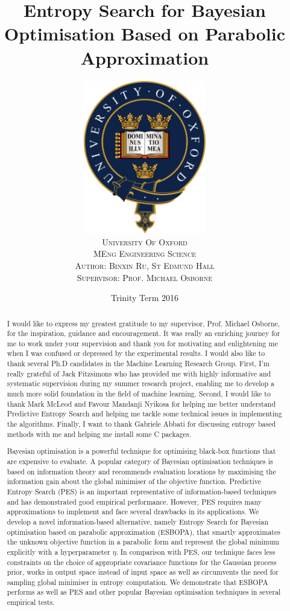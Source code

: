 \documentclass[a4paper,11pt]{report}
\title{\Huge{\textbf{Entropy Search for Bayesian Optimisation Based on Parabolic Approximation}}}
\author{\includegraphics [width=0.4\textwidth]{Oxford}\\
        \scshape\Large University Of Oxford\\
        \vspace{5cm}
        \scshape MEng Engineering Science\\        
        \Large Author: Binxin Ru, St Edmund Hall \\
        \Large Supervisor: Prof. Michael Osborne
       }
\date{Trinity Term 2016}
\begin{document}
\maketitle

\renewcommand{\abstractname}{Acknowledgements}
\begin{abstract}
I would like to express my greatest gratitude to my supervisor, Prof. Michael Osborne, for the inspiration, guidance and encouragement. It was really an enriching journey for me to work under your supervision and thank you for motivating and enlightening me when I was confused or depressed by the experimental results. I would also like to thank several Ph.D candidates in the Machine Learning Research Group. First, I'm really grateful of Jack Fitzsimons who has provided me with highly informative and systematic supervision during my summer research project, enabling me to develop a much more solid foundation in the field of machine learning. Second, I would like to thank Mark McLeod and Favour Mandanji Nyikosa for helping me better understand Predictive Entropy Search and helping me tackle some technical issues in implementing the algorithms. Finally, I want to thank Gabriele Abbati for discussing entropy based methods with me and helping me install some C packages. 
\end{abstract}

\renewcommand{\abstractname}{Abstract}

\begin{abstract}
Bayesian optimisation is a powerful technique for optimising black-box functions that are expensive to evaluate\cite{brochu2010tutorial}.  A popular category of Bayesian optimisation techniques is based on information theory and recommends evaluation locations by maximising the information gain about the global minimiser of the objective function. Predictive Entropy Search (PES) is an important representative of information-based techniques and has demonstrated good empirical performance. However, PES requires many approximations to implement and face several drawbacks in its applications. We develop a novel information-based alternative, namely Entropy Search for Bayesian optimisation based on parabolic approximation (ESBOPA), that smartly approximates the unknown objective function in a parabolic form and represent the global minimum explicitly with a hyperparameter $\eta$. In comparison with PES, our technique faces less constraints on the choice of appropriate covariance functions for the Gaussian process prior, works in output space instead of input space as well as circumvents the need for sampling global minimiser in entropy computation. We demonstrate that ESBOPA performs as well as PES and other popular Bayesian optimisation techniques in several empirical tests.

\end{abstract}
\end{document}
